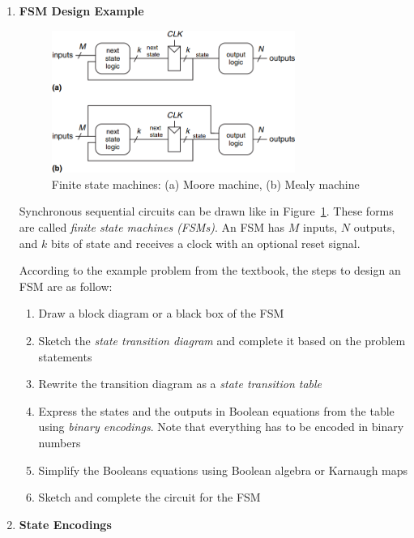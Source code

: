 \documentclass[12pt]{article}
\begin{document}
\begin{enumerate}
  \item \textbf{FSM Design Example}

  \begin{figure}[ht]
    \centering
    \includegraphics[width=0.75\textwidth]{moore_and_mealy_fsm.png}
    \caption{Finite state machines: (a) Moore machine, (b) Mealy machine}
    \label{figure:12}
  \end{figure}

  Synchronous sequential circuits can be drawn like in Figure~\ref{figure:12}. These forms are called \textit{finite state machines (FSMs)}. An FSM has $M$ inputs, $N$ outputs, and $k$ bits of state and receives a clock with an optional reset signal.

  According to the example problem from the textbook, the steps to design an FSM are as follow:

  \begin{enumerate}
    \item Draw a block diagram or a black box of the FSM
    \item Sketch the \textit{state transition diagram} and complete it based on the problem statements
    \item Rewrite the transition diagram as a \textit{state transition table}
    \item Express the states and the outputs in Boolean equations from the table using \textit{binary encodings}. Note that everything has to be encoded in binary numbers
    \item Simplify the Booleans equations using Boolean algebra or Karnaugh maps
    \item Sketch and complete the circuit for the FSM
  \end{enumerate}

  \item \textbf{State Encodings}


\end{enumerate}
\end{document}

